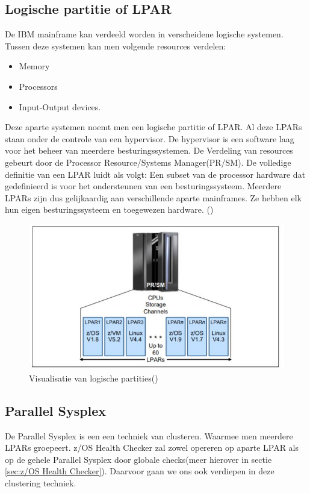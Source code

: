 \subsection{Logische partitie of LPAR}
\label{subsec:Logische partitie of LPAR}
De IBM mainframe kan verdeeld worden in verscheidene logische systemen. Tussen deze systemen kan men volgende resources verdelen:
\begin{itemize}
	\item Memory
	\item Processors
	\item Input-Output devices.
\end{itemize}
Deze aparte systemen noemt men een logische partitie of LPAR. Al deze LPARs staan onder de controle van een hypervisor. De hypervisor is een software laag voor het beheer van meerdere besturingssystemen. De Verdeling van resources gebeurt door de Processor Resource/Systems Manager(PR/SM). De volledige definitie van een LPAR luidt als volgt: Een subset van de processor hardware dat gedefinieerd is voor het ondersteunen van een besturingssysteem. Meerdere LPARs zijn dus gelijkaardig aan verschillende aparte mainframes. Ze hebben elk hun eigen besturingssysteem en toegewezen hardware. (\cite{Ebbers2011})

\begin{figure}[h]
	\centering
	\includegraphics{img/LPAR}
	\caption[Logische Partities]{Visualisatie van logische partities(\cite{Ebbers2011})}
	\label{fig:lpar}
\end{figure}


\subsection{Parallel Sysplex}
\label{subsec:Parallel Sysplex}

De Parallel Sysplex is een een techniek van clusteren. Waarmee men meerdere LPARs groepeert.  z/OS Health Checker zal zowel opereren op aparte LPAR als op de gehele Parallel Sysplex door globale checks(meer hierover in sectie \ref{sec:z/OS Health Checker}). Daarvoor gaan we ons ook verdiepen in deze clustering techniek.

